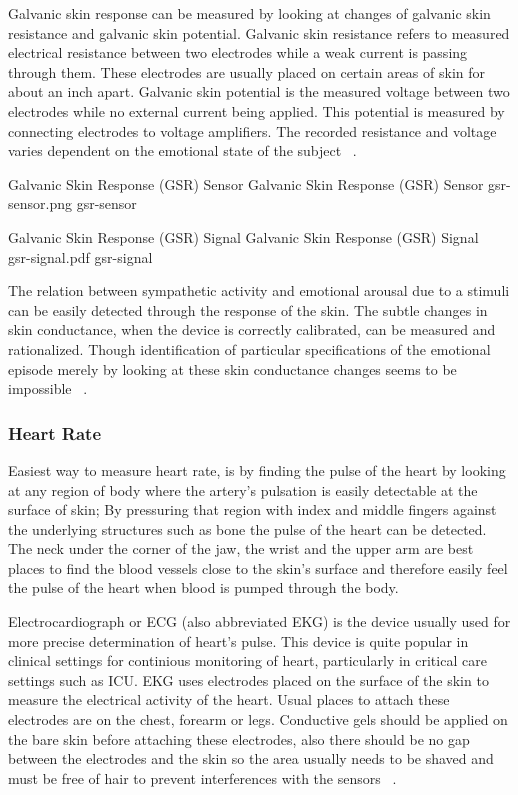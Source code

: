 Galvanic skin response can be measured by looking at changes of galvanic skin resistance and galvanic skin potential. Galvanic skin resistance refers to measured electrical resistance between two electrodes while a weak current is passing through them. These electrodes are usually placed on certain areas of skin for about an inch apart. Galvanic skin potential is the measured voltage between two electrodes while no external current being applied. This potential is measured by connecting electrodes to voltage amplifiers. The recorded resistance and voltage varies dependent on the emotional state of the subject ~\cite{pflanzer2013galvanic}.

\img
{Galvanic Skin Response (GSR) Sensor}
{Galvanic Skin Response (GSR) Sensor}
{gsr-sensor.png}
{gsr-sensor}

\img
{Galvanic Skin Response (GSR) Signal}
{Galvanic Skin Response (GSR) Signal ~\cite{wiki2014gsr}}
{gsr-signal.pdf}
{gsr-signal}

The relation between sympathetic activity and emotional arousal due to a stimuli can be easily detected through the response of the skin. The subtle changes in skin conductance, when the device is correctly calibrated, can be measured and rationalized. Though identification of particular specifications of the emotional episode merely by looking at these skin conductance changes seems to be impossible ~\cite{pflanzer2013galvanic}.

\subsubsection{Heart Rate}
Easiest way to measure heart rate, is by finding the pulse of the heart by looking at any region of body where the artery's pulsation is easily detectable at the surface of skin; By pressuring that region with index and middle fingers against the underlying structures such as bone the pulse of the heart can be detected. The neck under the corner of the jaw, the wrist and the upper arm are best places to find the blood vessels close to the skin's surface and therefore easily feel the pulse of the heart when blood is pumped through the body.

Electrocardiograph or ECG (also abbreviated EKG) is the device usually used for more precise determination of heart's pulse. This device is quite popular in clinical settings for continious monitoring of heart, particularly in critical care settings such as ICU. EKG uses electrodes placed on the surface of the skin to measure the electrical activity of the heart. Usual places to attach these electrodes are on the chest, forearm or legs. Conductive gels should be applied on the bare skin before attaching these electrodes, also there should be no gap between the electrodes and the skin so the area usually needs to be shaved and must be free of hair to prevent interferences with the sensors ~\cite{stern2001psychophysiological}.

